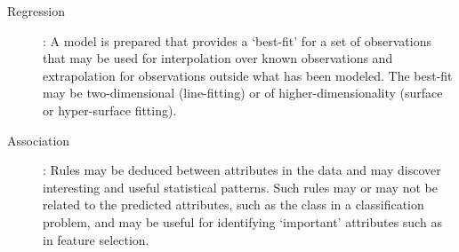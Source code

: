 \begin{description}
	\item[Regression]: A model is prepared that provides a `best-fit' for a set of observations that may be used for interpolation over known observations and extrapolation for observations outside what has been modeled. The best-fit may be two-dimensional (line-fitting) or of higher-dimensionality (surface or hyper-surface fitting).
	
	\item[Association]: Rules may be deduced between attributes in the data and may discover interesting and useful statistical patterns. Such rules may or may not be related to the predicted attributes, such as the class in a classification problem, and may be useful for identifying `important' attributes such as in feature selection.
		
\end{description}
